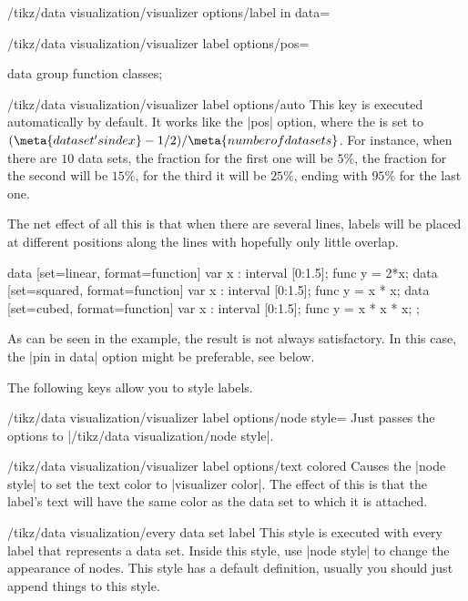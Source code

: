 \begin{key}{/tikz/data visualization/visualizer options/label in data=}
\begin{key}{/tikz/data visualization/visualizer label options/pos=}
\begin{codeexample}[width=6.3cm]
data group {function classes};
\end{codeexample}
  \end{key}
  \begin{key}{/tikz/data visualization/visualizer label options/auto}
    This key is executed automatically by default. It works like the
    |pos| option, where the  is set to $(\meta{data set's
      index}-1/2)/\meta{number of data sets}$. For instance, when
    there are $10$ data sets, the fraction for the first one will be
    $5\%$, the fraction for the second will be $15\%$, for the third
    it will be $25\%$, ending with $95\%$ for the last one.

    The net effect of all this is that when there are several lines,
    labels will be placed at different positions along the lines with
    hopefully only little overlap.
\begin{codeexample}[width=6.3cm]
\tikz \datavisualization [
  scientific axes=clean,
  visualize as smooth line/.list={linear, squared, cubed},
  linear ={label in data={text=$2x$}},
  squared={label in data={text=$x^2$}},
  cubed  ={label in data={text=$x^3$}}]
data [set=linear, format=function] {
  var x : interval [0:1.5];
  func y = 2*\value x;
}
data [set=squared, format=function] {
  var x : interval [0:1.5];
  func y = \value x * \value x;
}
data [set=cubed, format=function] {
  var x : interval [0:1.5];
  func y = \value x * \value x * \value x;
};
\end{codeexample}
    As can be seen in the example, the result is not always
    satisfactory. In this case, the |pin in data| option might be
    preferable, see below.
  \end{key}
  
  The following keys allow you to style labels.

  \begin{key}{/tikz/data visualization/visualizer label
      options/node style=}
    Just passes the options to |/tikz/data visualization/node style|.
  \end{key}
  \begin{key}{/tikz/data visualization/visualizer label
      options/text colored}
    Causes the |node style| to set the text color to
    |visualizer color|. The effect of this is that the label's text
    will have the same color as the data set to which it is attached.
  \end{key}
  
  \begin{stylekey}{/tikz/data visualization/every data set label}
    This style is executed with every label that represents a
    data set. Inside this style, use |node style| to change the
    appearance of nodes. This style has a default definition, usually
    you should just append things to this style.


\end{stylekey}
\end{key}
